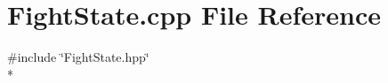\section{Fight\-State.\-cpp File Reference}
\label{_fight_state_8cpp}
{\ttfamily \#include \char`\"{}Fight\-State.\-hpp\char`\"{}}\\*
